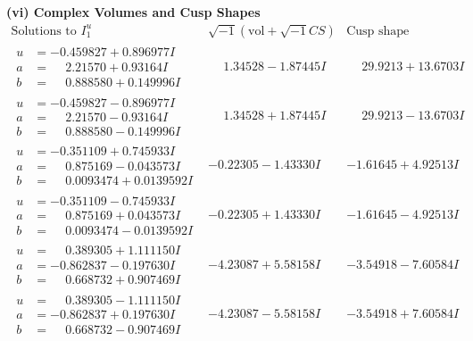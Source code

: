 \documentclass[1p]{elsarticle_modified}
\theoremstyle{definition}
\newcommand{\I}{\sqrt{-1}}
\begin{document}
\newpage\flushleft \textbf{(vi) Complex Volumes and Cusp Shapes}
$$\begin{array}{c|c|c}  
\text{Solutions to }I^u_{1}& \I (\text{vol} + \sqrt{-1}CS) & \text{Cusp shape}\\
 \hline 
\begin{aligned}
u &= -0.459827 + 0.896977 I \\
a &= \phantom{-}2.21570 + 0.93164 I \\
b &= \phantom{-}0.888580 + 0.149996 I\end{aligned}
 & \phantom{-}1.34528 - 1.87445 I & \phantom{-}29.9213 + 13.6703 I \\ \hline\begin{aligned}
u &= -0.459827 - 0.896977 I \\
a &= \phantom{-}2.21570 - 0.93164 I \\
b &= \phantom{-}0.888580 - 0.149996 I\end{aligned}
 & \phantom{-}1.34528 + 1.87445 I & \phantom{-}29.9213 - 13.6703 I \\ \hline\begin{aligned}
u &= -0.351109 + 0.745933 I \\
a &= \phantom{-}0.875169 - 0.043573 I \\
b &= \phantom{-}0.0093474 + 0.0139592 I\end{aligned}
 & -0.22305 - 1.43330 I & -1.61645 + 4.92513 I \\ \hline\begin{aligned}
u &= -0.351109 - 0.745933 I \\
a &= \phantom{-}0.875169 + 0.043573 I \\
b &= \phantom{-}0.0093474 - 0.0139592 I\end{aligned}
 & -0.22305 + 1.43330 I & -1.61645 - 4.92513 I \\ \hline\begin{aligned}
u &= \phantom{-}0.389305 + 1.111150 I \\
a &= -0.862837 - 0.197630 I \\
b &= \phantom{-}0.668732 + 0.907469 I\end{aligned}
 & -4.23087 + 5.58158 I & -3.54918 - 7.60584 I \\ \hline\begin{aligned}
u &= \phantom{-}0.389305 - 1.111150 I \\
a &= -0.862837 + 0.197630 I \\
b &= \phantom{-}0.668732 - 0.907469 I\end{aligned}
 & -4.23087 - 5.58158 I & -3.54918 + 7.60584 I \\ \hline\begin{aligned}

\end{aligned}
\end{array}$$
\end{document}
